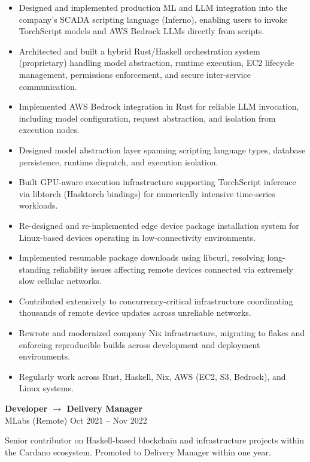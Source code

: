 \documentclass[11pt]{article}
\begin{document}
\begin{itemize}
    \item Designed and implemented production ML and LLM integration into the company's SCADA scripting language (Inferno), enabling users to invoke TorchScript models and AWS Bedrock LLMs directly from scripts.
    \item Architected and built a hybrid Rust/Haskell orchestration system (proprietary) handling model abstraction, runtime execution, EC2 lifecycle management, permissions enforcement, and secure inter-service communication.
    \item Implemented AWS Bedrock integration in Rust for reliable LLM invocation, including model configuration, request abstraction, and isolation from execution nodes.
    \item Designed model abstraction layer spanning scripting language types, database persistence, runtime dispatch, and execution isolation.
    \item Built GPU-aware execution infrastructure supporting TorchScript inference via libtorch (Hasktorch bindings) for numerically intensive time-series workloads.
    \item Re-designed and re-implemented edge device package installation system for Linux-based devices operating in low-connectivity environments.
    \item Implemented resumable package downloads using libcurl, resolving long-standing reliability issues affecting remote devices connected via extremely slow cellular networks.
    \item Contributed extensively to concurrency-critical infrastructure coordinating thousands of remote device updates across unreliable networks.
    \item Rewrote and modernized company Nix infrastructure, migrating to flakes and enforcing reproducible builds across development and deployment environments.
    \item Regularly work across Rust, Haskell, Nix, AWS (EC2, S3, Bedrock), and Linux systems.
\end{itemize}

\vspace{6pt}

\textbf{Developer $\rightarrow$ Delivery Manager} \\
MLabs (Remote) \hfill Oct 2021 -- Nov 2022

Senior contributor on Haskell-based blockchain and infrastructure projects within the Cardano ecosystem. Promoted to Delivery Manager within one year.
\end{document}
